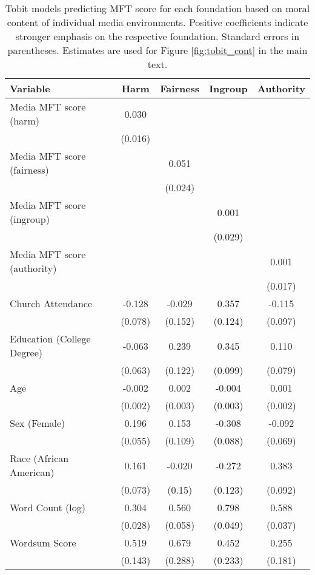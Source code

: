 \begin{table}[ht]
\centering
\caption{Tobit models predicting MFT score for each foundation based 
           on moral content of individual media environments. Positive coefficients 
           indicate stronger emphasis on the respective foundation. Standard errors in parentheses. 
           Estimates are used for Figure \ref{fig:tobit_cont} in the main text.} 
\label{tab:tobit_cont}
\begingroup\footnotesize
\begin{tabular}{lcccc}
  \hline
Variable & Harm & Fairness & Ingroup & Authority \\ 
  \hline
Media MFT score (harm) &  0.030 &  &  &  \\ 
   & (0.016) &  &  &  \\ 
  Media MFT score (fairness) &  &  0.051 &  &  \\ 
   &  & (0.024) &  &  \\ 
  Media MFT score (ingroup) &  &  &  0.001 &  \\ 
   &  &  & (0.029) &  \\ 
  Media MFT score (authority) &  &  &  &  0.001 \\ 
   &  &  &  & (0.017) \\ 
  Church Attendance & -0.128 & -0.029 &  0.357 & -0.115 \\ 
   & (0.078) & (0.152) & (0.124) & (0.097) \\ 
  Education (College Degree) & -0.063 &  0.239 &  0.345 &  0.110 \\ 
   & (0.063) & (0.122) & (0.099) & (0.079) \\ 
  Age & -0.002 &  0.002 & -0.004 &  0.001 \\ 
   & (0.002) & (0.003) & (0.003) & (0.002) \\ 
  Sex (Female) &  0.196 &  0.153 & -0.308 & -0.092 \\ 
   & (0.055) & (0.109) & (0.088) & (0.069) \\ 
  Race (African American) &  0.161 & -0.020 & -0.272 &  0.383 \\ 
   & (0.073) & (0.15) & (0.123) & (0.092) \\ 
  Word Count (log) &  0.304 &  0.560 &  0.798 &  0.588 \\ 
   & (0.028) & (0.058) & (0.049) & (0.037) \\ 
  Wordsum Score &  0.519 &  0.679 &  0.452 &  0.255 \\ 
   & (0.143) & (0.288) & (0.233) & (0.181) \\ 

\end{tabular}
\end{table}
